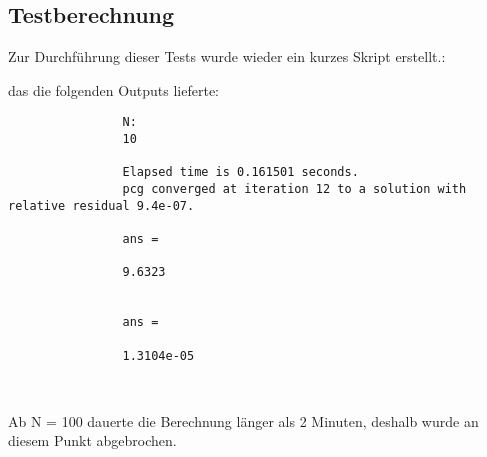 \documentclass[11pt,titlepage]{article}
\begin{document}
		
		
		\subsection{Testberechnung}
			Zur Durchführung dieser Tests wurde wieder ein kurzes Skript erstellt.:
			
			

			das die folgenden Outputs lieferte:
			
			\begin{lstlisting}
				N:
				10
				
				Elapsed time is 0.161501 seconds.
				pcg converged at iteration 12 to a solution with relative residual 9.4e-07.
				
				ans =
				
				9.6323
				
				
				ans =
				
				1.3104e-05
				
				
			\end{lstlisting}
			
			Ab N = 100 dauerte die Berechnung länger als 2 Minuten, deshalb wurde an diesem Punkt abgebrochen.
			
\end{document}
